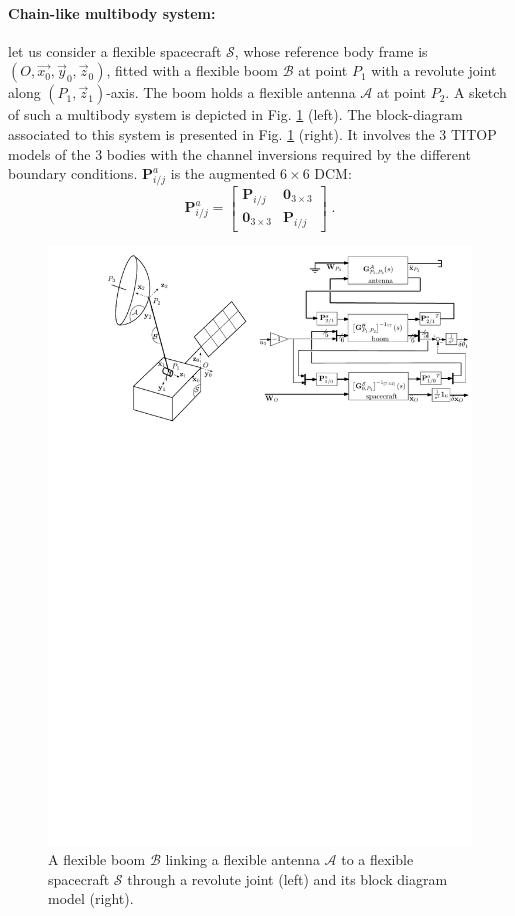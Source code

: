\documentclass[smallcondensed]{svjour3}     %
\begin{document}
\paragraph{Chain-like multibody system:}
let us consider a flexible spacecraft $\mathcal{S}$, whose reference body frame is $(O,\vec{x_0},\vec{y}_0,\vec{z}_0)$, fitted with a flexible boom $\mathcal{B}$ at point $P_1$ with a revolute joint along $(P_1,\vec{z}_1)$-axis.  The boom holds a flexible antenna $\mathcal{A}$ at point $P_2$. A sketch of such a multibody system is depicted in Fig. \ref{fig:3bodies} (left). The block-diagram associated to this system is presented in Fig.  \ref{fig:3bodies} (right). It involves the 3 TITOP models of the 3 bodies with the channel inversions required by the different boundary conditions. $\mathbf{P}^a_{i/j}$ is the augmented $6 \times 6$ DCM:
\[
\mathbf{P}^a_{i/j}=\left[\begin{array}{cc}\mathbf{P}_{i/j}& \mathbf{0}_{3\times 3}\\\mathbf{0}_{3\times 3} & \mathbf{P}_{i/j}\end{array}\right]\;.
\]
\begin{figure}[htbp!]
  \includegraphics[width=\textwidth]{3bodies_bis.pdf}
\caption{A flexible boom $\mathcal{B}$ linking a flexible antenna $\mathcal{A}$ to a flexible spacecraft $\mathcal{S}$ through a revolute joint (left) and its block diagram model (right).}
\label{fig:3bodies} 
\end{figure}
\end{document}
